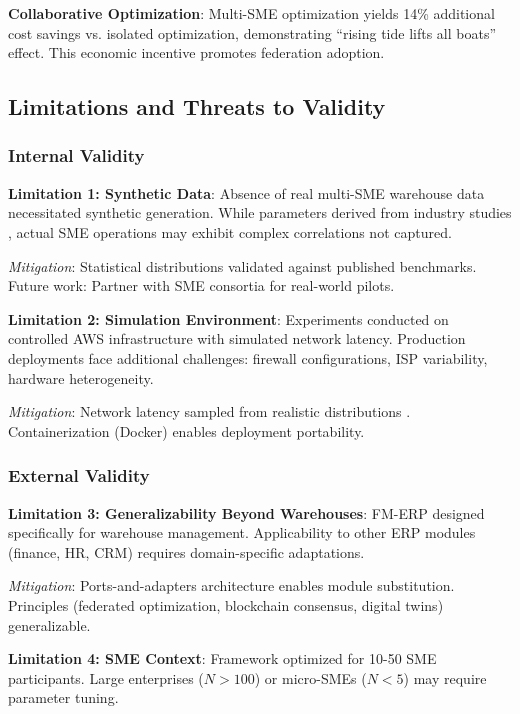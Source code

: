 \documentclass[times,10pt,twocolumn]{jucs2e}
\begin{document}
\textbf{Collaborative Optimization}: Multi-SME optimization yields 14\% additional cost savings vs. isolated optimization, demonstrating ``rising tide lifts all boats'' effect. This economic incentive promotes federation adoption.

\subsection{Limitations and Threats to Validity}

\subsubsection{Internal Validity}

\textbf{Limitation 1: Synthetic Data}: Absence of real multi-SME warehouse data necessitated synthetic generation. While parameters derived from industry studies \cite{Davis2023,Garcia2024}, actual SME operations may exhibit complex correlations not captured.

\textit{Mitigation}: Statistical distributions validated against published benchmarks. Future work: Partner with SME consortia for real-world pilots.

\textbf{Limitation 2: Simulation Environment}: Experiments conducted on controlled AWS infrastructure with simulated network latency. Production deployments face additional challenges: firewall configurations, ISP variability, hardware heterogeneity.

\textit{Mitigation}: Network latency sampled from realistic distributions \cite{Gill2007}. Containerization (Docker) enables deployment portability.

\subsubsection{External Validity}

\textbf{Limitation 3: Generalizability Beyond Warehouses}: FM-ERP designed specifically for warehouse management. Applicability to other ERP modules (finance, HR, CRM) requires domain-specific adaptations.

\textit{Mitigation}: Ports-and-adapters architecture enables module substitution. Principles (federated optimization, blockchain consensus, digital twins) generalizable.

\textbf{Limitation 4: SME Context}: Framework optimized for 10-50 SME participants. Large enterprises ($N > 100$) or micro-SMEs ($N < 5$) may require parameter tuning.
\end{document}
